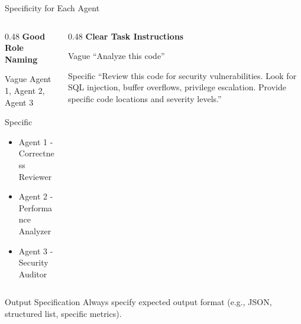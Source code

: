 \documentclass[aspectratio=169,11pt]{beamer}
\begin{document}
\begin{frame}{Specificity for Each Agent}
    \begin{columns}[T]
        \begin{column}{0.48\textwidth}
            \textbf{Good Role Naming}

            \begin{alertblock}{Vague}
                \footnotesize
                Agent 1, Agent 2, Agent 3
            \end{alertblock}

            \begin{exampleblock}{Specific}
                \footnotesize
                \begin{itemize}
                    \item Agent 1 - Correctness Reviewer
                    \item Agent 2 - Performance Analyzer
                    \item Agent 3 - Security Auditor
                \end{itemize}
            \end{exampleblock}
        \end{column}
        \begin{column}{0.48\textwidth}
            \textbf{Clear Task Instructions}

            \begin{alertblock}{Vague}
                \footnotesize
                ``Analyze this code''
            \end{alertblock}

            \begin{exampleblock}{Specific}
                \footnotesize
                ``Review this code for security vulnerabilities. Look for SQL injection, buffer overflows, privilege escalation. Provide specific code locations and severity levels.''
            \end{exampleblock}
        \end{column}
    \end{columns}

    \vspace{0.3cm}
    \begin{block}{Output Specification}
        \footnotesize
        Always specify expected output format (e.g., JSON, structured list, specific metrics).
    \end{block}
\end{frame}
\end{document}
